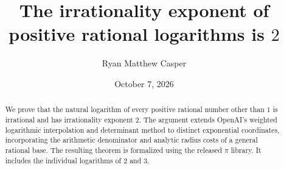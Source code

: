 \documentclass[11pt]{article}
\title{The irrationality exponent of positive rational logarithms is \(2\)}
\author{Ryan Matthew Casper}
\date{October 7, 2026}
\theoremstyle{definition}
\theoremstyle{remark}
\begin{document}
\maketitle
\begin{abstract}
We prove that the natural logarithm of every positive rational number other
than \(1\) is irrational and has irrationality exponent \(2\).
The argument extends OpenAI's weighted logarithmic interpolation and
determinant method to distinct exponential coordinates, incorporating the
arithmetic denominator and analytic radius costs of a general rational base.
The resulting theorem is formalized using the released \(\pi\) library.
It includes the individual logarithms of \(2\) and \(3\).
\end{abstract}





\renewcommand{\bibfont}{\raggedright}


\end{document}
